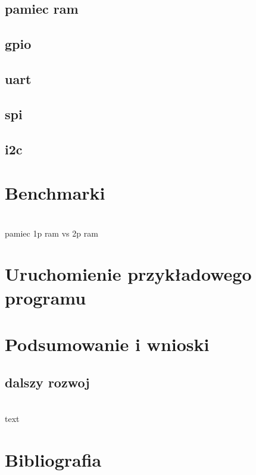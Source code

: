 \documentclass[11pt,a4paper]{article}
\begin{document}
\subsection{pamiec ram}

\subsection{gpio}

\subsection{uart}

\subsection{spi}

\subsection{i2c}

\newpage
\section{Benchmarki}
\hspace{5mm}
	\\ pamiec 1p ram vs 2p ram

\newpage
\section{Uruchomienie przykładowego programu}
\newpage
\section{Podsumowanie i wnioski}
	\subsection{dalszy rozwoj}
	\hspace{5mm}
		\\text

\newpage

\section{Bibliografia}
\end{document}
